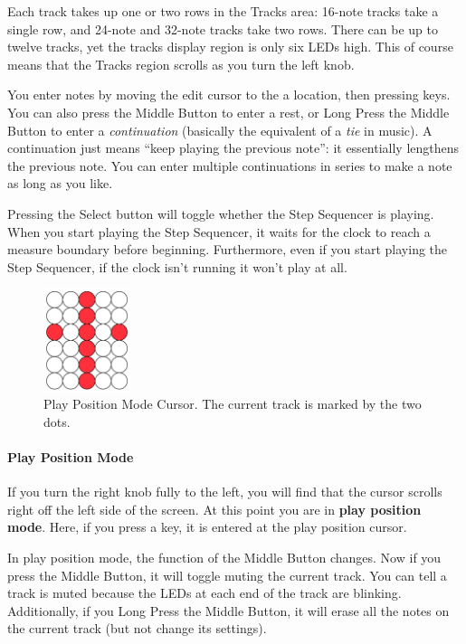 \documentclass{article}
\begin{document}
Each track takes up one or two rows in the Tracks area: 16-note tracks take a single row, and 24-note and 32-note tracks take two rows.    There can be up to twelve tracks, yet the tracks display region is only six LEDs high.  This of course means that  the Tracks region scrolls as you turn the left knob.

You enter notes by moving the edit cursor to the a location, then pressing keys.  You can also press the Middle Button to enter a rest, or Long Press the Middle Button to enter a {\it continuation} (basically the equivalent of a {\it tie} in music).  A continuation just means ``keep playing the previous note'': it essentially lengthens the previous note.  You can enter multiple continuations in series to make a note as long as you like.

Pressing the Select button will toggle whether the Step Sequencer is playing.  When you start playing the Step Sequencer, it waits for the clock to reach a measure boundary before beginning.  Furthermore, even if you start playing the Step Sequencer, if the clock isn't running it won't play at all.

\begin{figure}
\vspace{-3em}\includegraphics[width=1in]{playpositionmode}
\vspace{-1em}
\caption{\small Play Position Mode Cursor.  The current track is marked by the two dots.}\vspace{-2em}
\label{playpositionmode}
\end{figure}

\paragraph{Play Position Mode}

If you turn the right knob fully to the left, you will find that the cursor scrolls right off the left side of the screen.  At this point you are in {\bf play position mode}.  Here, if you press a key, it is entered at the play position cursor.

In play position mode, the function of the Middle Button changes.  Now if you press the Middle Button, it will toggle muting the current track.  You can tell a track is muted because the LEDs at each end of the track are blinking.  Additionally, if you Long Press the Middle Button, it will erase all the notes on the current track (but not change its settings).
\end{document}

